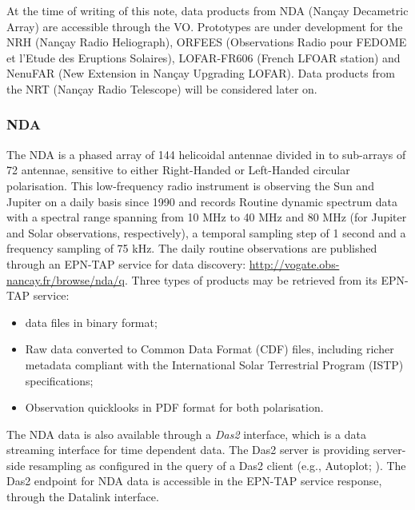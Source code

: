 \documentclass[11pt,a4paper]{ivoatex/ivoa}
\begin{document}
At the time of writing of this note, data products from NDA (Nan\c cay Decametric Array) are accessible 
through the VO. Prototypes are under development for the NRH (Nan\c cay Radio Heliograph), ORFEES 
(Observations Radio pour FEDOME et l'Etude des Eruptions Solaires), LOFAR-FR606 (French LFOAR station) 
and NenuFAR (New Extension in Nan\c cay Upgrading LOFAR). Data products from the NRT (Nan\c cay Radio 
Telescope) will be considered later on. 


\subsubsection{NDA}
The NDA is a phased array of 144 helicoidal antennae divided in to sub-arrays of 72 antennae, sensitive 
to either Right-Handed or Left-Handed circular polarisation. This low-frequency radio instrument is
observing the Sun and Jupiter on a daily basis since 1990 and records Routine dynamic spectrum data with 
a spectral range spanning from 10 MHz to 40 MHz and 80 MHz (for Jupiter and Solar observations, 
respectively), a temporal sampling step of 1 second and a frequency sampling of 75 kHz. The daily 
routine observations are published through an EPN-TAP service for data discovery: 
\url{http://vogate.obs-nancay.fr/browse/nda/q}. Three types of products may be retrieved from its 
EPN-TAP service:
\begin{itemize}
\item data files in binary format;
\item Raw data converted to Common Data Format (CDF) files, including richer metadata compliant with the 
International Solar Terrestrial Program (ISTP) specifications;
\item Observation quicklooks in PDF format for both polarisation.
\end{itemize}

The NDA data is also available through a \emph{Das2} \citep{10.1002/essoar.10500359.1} interface, which 
is a data streaming interface for time dependent data. The Das2 server is providing server-side 
resampling as configured in the query of a Das2 client (e.g., Autoplot; \cite{10.1007/s12145-010-0049-0}). 
The Das2 endpoint for NDA data is accessible in the EPN-TAP service response, through the Datalink interface.
 
\end{document}
